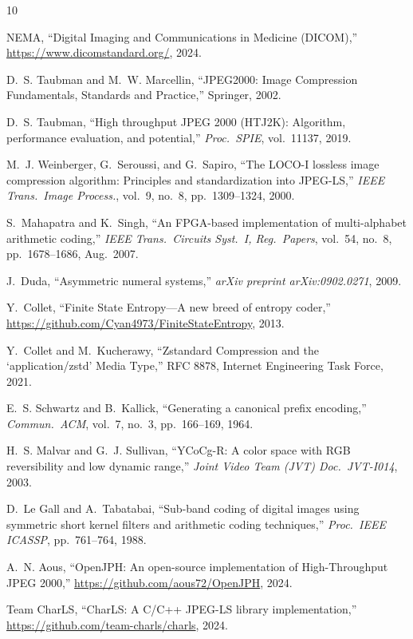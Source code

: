 \documentclass[11pt,twocolumn]{article}
\begin{document}
\begin{thebibliography}{10}

NEMA, ``Digital Imaging and Communications in Medicine (DICOM),''
\url{https://www.dicomstandard.org/}, 2024.

D.~S. Taubman and M.~W. Marcellin,
``JPEG2000: Image Compression Fundamentals, Standards and Practice,''
Springer, 2002.

D.~S. Taubman,
``High throughput JPEG 2000 (HTJ2K): Algorithm, performance evaluation, and potential,''
\emph{Proc.\ SPIE}, vol.\ 11137, 2019.

M.~J. Weinberger, G.~Seroussi, and G.~Sapiro,
``The LOCO-I lossless image compression algorithm: Principles and standardization into JPEG-LS,''
\emph{IEEE Trans.\ Image Process.}, vol.~9, no.~8, pp.~1309--1324, 2000.

S.~Mahapatra and K.~Singh,
``An FPGA-based implementation of multi-alphabet arithmetic coding,''
\emph{IEEE Trans.\ Circuits Syst.\ I, Reg.\ Papers}, vol.~54, no.~8, pp.~1678--1686, Aug.\ 2007.

J.~Duda,
``Asymmetric numeral systems,''
\emph{arXiv preprint arXiv:0902.0271}, 2009.

Y.~Collet,
``Finite State Entropy---A new breed of entropy coder,''
\url{https://github.com/Cyan4973/FiniteStateEntropy}, 2013.

Y.~Collet and M.~Kucherawy,
``Zstandard Compression and the `application/zstd' Media Type,''
RFC 8878, Internet Engineering Task Force, 2021.

E.~S. Schwartz and B.~Kallick,
``Generating a canonical prefix encoding,''
\emph{Commun.\ ACM}, vol.~7, no.~3, pp.~166--169, 1964.

H.~S. Malvar and G.~J. Sullivan,
``YCoCg-R: A color space with RGB reversibility and low dynamic range,''
\emph{Joint Video Team (JVT) Doc.\ JVT-I014}, 2003.

D.~Le Gall and A.~Tabatabai,
``Sub-band coding of digital images using symmetric short kernel filters and arithmetic coding techniques,''
\emph{Proc.\ IEEE ICASSP}, pp.~761--764, 1988.

A.~N. Aous,
``OpenJPH: An open-source implementation of High-Throughput JPEG 2000,''
\url{https://github.com/aous72/OpenJPH}, 2024.

Team CharLS,
``CharLS: A C/C++ JPEG-LS library implementation,''
\url{https://github.com/team-charls/charls}, 2024.

\end{thebibliography}
\end{document}
